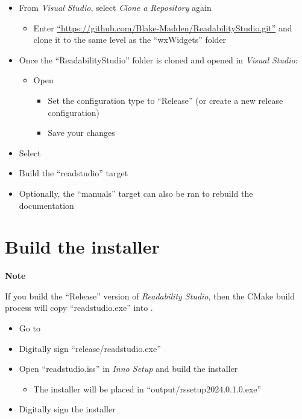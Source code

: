 \documentclass[
  letterpaper,
]{LegrandOrangeBook}
\providecommand{\tightlist}{%
  \setlength{\itemsep}{0pt}\setlength{\parskip}{0pt}}
\newenvironment{notesection}
    {
    \begin{tcolorbox}[colframe=mediumblue,colback=lightblue,coltext=mediumblue,arc=3mm]
    \faEdit[regular] \textbf{Note} \newline
    }
    {
    \end{tcolorbox}
    }
\begin{document}
\begin{itemize}
\tightlist
\item
  From \emph{Visual Studio}, select \emph{Clone a Repository} again

  \begin{itemize}
  \tightlist
  \item
    Enter
    \href{https://github.com/Blake-Madden/ReadabilityStudio.git}{``https://github.com/Blake-Madden/ReadabilityStudio.git''}
    and clone it to the same level as the ``wxWidgets'' folder
  \end{itemize}
\item
  Once the ``ReadabilityStudio'' folder is cloned and opened in
  \emph{Visual Studio}:

  \begin{itemize}
  \tightlist
  \item
    Open 

    \begin{itemize}
    \tightlist
    \item
      Set the configuration type to ``Release'' (or create a new release
      configuration)
    \item
      Save your changes
    \end{itemize}
  \end{itemize}
\item
  Select 
\item
  Build the ``readstudio'' target
\item
  Optionally, the ``manuals'' target can also be ran to rebuild the
  documentation
\end{itemize}

\section*{Build the installer}\label{build-the-installer}


\begin{notesection}
If you build the ``Release'' version of \emph{Readability Studio}, then
the CMake build process will copy ``readstudio.exe'' into
.

\end{notesection}

\begin{itemize}
\tightlist
\item
  Go to 
\item
  Digitally sign ``release/readstudio.exe''
\item
  Open ``readstudio.iss'' in \emph{Inno Setup} and build the installer

  \begin{itemize}
  \tightlist
  \item
    The installer will be placed in ``output/rssetup2024.0.1.0.exe''
  \end{itemize}
\item
  Digitally sign the installer
\end{itemize}
\end{document}
